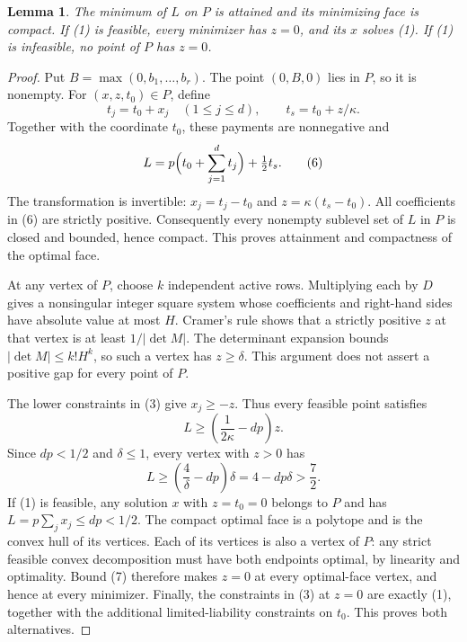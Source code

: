 \documentclass[11pt]{article}
\newtheorem{lemma}[theorem]{Lemma}
\begin{document}
\begin{lemma}\label{lem:penalty}
The minimum of \(L\) on \(P\) is attained and its minimizing face is
compact. If (1) is feasible, every minimizer has \(z=0\), and its
\(x\) solves (1). If (1) is infeasible, no point of \(P\) has \(z=0\).
\end{lemma}
\begin{proof}
Put \(B=\max(0,b_1,\ldots,b_r)\). The point \((0,B,0)\) lies in
\(P\), so it is nonempty. For \((x,z,t_0)\in P\), define
\[
 t_j=t_0+x_j\quad(1\leq j\leq d),\qquad
 t_s=t_0+z/\kappa.                                  \tag{5}
\]
Together with the coordinate \(t_0\), these payments are nonnegative and
\[
 L=p\Bigl(t_0+\sum_{j=1}^d t_j\Bigr)+\tfrac12t_s.
                                                               \tag{6}
\]
The transformation is invertible: \(x_j=t_j-t_0\) and
\(z=\kappa(t_s-t_0)\). All coefficients in (6) are strictly positive.
Consequently every nonempty sublevel set of \(L\) in \(P\) is closed
and bounded, hence compact. This proves attainment and compactness of the
optimal face.

At any vertex of \(P\), choose \(k\) independent active rows. Multiplying
each by \(D\) gives a nonsingular integer square system whose coefficients
and right-hand sides have absolute value at most \(H\). Cramer's rule
shows that a strictly positive \(z\) at that vertex is at least
\(1/|\det M|\). The determinant expansion bounds
\(|\det M|\leq k!H^k\), so such a vertex has \(z\geq\delta\).
This argument does not assert a positive gap for every point of \(P\).

The lower constraints in (3) give \(x_j\geq-z\). Thus every feasible
point satisfies
\[
 L\geq \left(\frac1{2\kappa}-dp\right)z.
\]
Since \(dp<1/2\) and \(\delta\leq1\), every vertex with \(z>0\) has
\[
 L\geq\left(\frac4\delta-dp\right)\delta
       =4-dp\delta>\frac72.                          \tag{7}
\]
If (1) is feasible, any solution \(x\) with \(z=t_0=0\) belongs to
\(P\) and has \(L=p\sum_jx_j\leq dp<1/2\).
The compact optimal face is a polytope and is the convex hull of its
vertices. Each of its vertices is also a vertex of \(P\): any strict
feasible convex decomposition must have both endpoints optimal, by
linearity and optimality. Bound (7) therefore makes \(z=0\) at every
optimal-face vertex, and hence at every minimizer. Finally, the constraints
in (3) at \(z=0\) are exactly (1), together with the additional
limited-liability constraints on \(t_0\). This proves both alternatives.
\end{proof}
\end{document}

